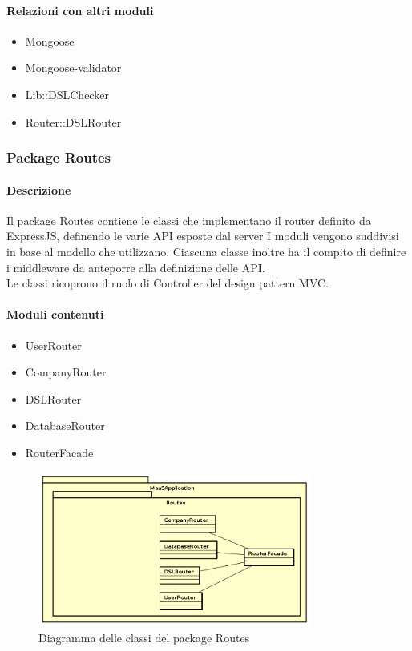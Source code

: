 \paragraph*{Relazioni con altri moduli}
\begin{itemize}
\item Mongoose
\item Mongoose-validator
\item Lib::DSLChecker
\item Router::DSLRouter
\end{itemize}


\subsubsection{Package Routes}
\paragraph*{Descrizione}
Il package Routes contiene le classi che  implementano il router definito da ExpressJS, definendo le varie API esposte dal server
I moduli vengono suddivisi in base al modello che utilizzano. 
Ciascuna classe inoltre ha il compito di definire i middleware da anteporre alla definizione delle API.\\
Le classi ricoprono il ruolo di Controller del design pattern MVC.

\paragraph*{Moduli contenuti}
\begin{itemize}
\item UserRouter
\item CompanyRouter
\item DSLRouter
\item DatabaseRouter
\item RouterFacade
\end{itemize}

\begin{figure}[H]
\centering
\includegraphics[width=0.8\textwidth]{res/sections/backend/routes.png}
\caption{Diagramma delle classi del package Routes}
\end{figure}

